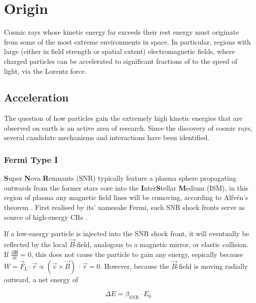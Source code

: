 \section{Origin}
\label{sec:cr-origin}

Cosmic rays whose kinetic energy far exceeds their rest energy must originate from some of the most extreme environments in space. In particular, regions with 
large (either in field strength or spatial extent) electromagnetic fields, where charged particles can be accelerated to significant fractions of to the speed of 
light, via the Lorentz force. 

\subsection{Acceleration}
\label{ssec:cr-acceleration}

The question of how particles gain the extremely high kinetic energies that are observed on earth is an active area of research. Since the discovery of cosmic
rays, several candidate mechanisms and interactions have been identified.

\subsubsection{Fermi Type I}
\label{sssec:cr-fermi-i}

\textbf{S}uper \textbf{N}ova \textbf{R}emnants (SNR) typically feature a plasma sphere propagating outwards from the former stars core into the 
\textbf{I}nter\textbf{S}tellar \textbf{M}edium (ISM), in this region of plasma any magnetic field lines will be comoving, according to Alfvén's theorem 
\cite{alfven1942existence}. First realised by its' namesake Fermi, such SNR shock fronts serve as source of high-energy CRs \cite{fermi1949origin}.

If a low-energy particle is injected into the SNR shock front, it will eventually be reflected by the local $\vec{B}$-field, analogous to a magnetic mirror, or 
elastic collision. If $\frac{\text{d}\mathbf{B}}{\text{d}t} = 0$, this does not cause the particle to gain any energy, espically because $W = \vec{F}_\text{L} \cdot
\vec{r} \propto (\vec{v}\times\vec{B})\,\cdot\,\vec{r} = 0$. However, because the $\vec{B}$-field is moving radially outward, a net energy of 

\begin{equation}
\label{eq:fermi-energy-gain}
\Delta E = \beta_\text{SNR} \cdot E_0
\end{equation}

